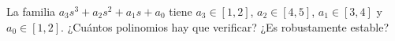 \begin{pausa}
La familia $a_3s^3+a_2s^2+a_1s+a_0$ tiene $a_3\in[1,2]$, $a_2\in[4,5]$, $a_1\in[3,4]$ y $a_0\in[1,2]$. ¿Cuántos polinomios hay que verificar? ¿Es robustamente estable?
\end{pausa}
